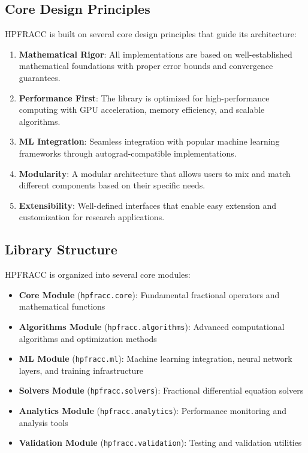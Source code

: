 \documentclass[12pt]{article}
\begin{document}
\subsection{Core Design Principles}

HPFRACC is built on several core design principles that guide its architecture:

\begin{enumerate}
\item \textbf{Mathematical Rigor}: All implementations are based on well-established mathematical foundations with proper error bounds and convergence guarantees.

\item \textbf{Performance First}: The library is optimized for high-performance computing with GPU acceleration, memory efficiency, and scalable algorithms.

\item \textbf{ML Integration}: Seamless integration with popular machine learning frameworks through autograd-compatible implementations.

\item \textbf{Modularity}: A modular architecture that allows users to mix and match different components based on their specific needs.

\item \textbf{Extensibility}: Well-defined interfaces that enable easy extension and customization for research applications.
\end{enumerate}

\subsection{Library Structure}

HPFRACC is organized into several core modules:

\begin{itemize}
\item \textbf{Core Module} (\texttt{hpfracc.core}): Fundamental fractional operators and mathematical functions
\item \textbf{Algorithms Module} (\texttt{hpfracc.algorithms}): Advanced computational algorithms and optimization methods
\item \textbf{ML Module} (\texttt{hpfracc.ml}): Machine learning integration, neural network layers, and training infrastructure
\item \textbf{Solvers Module} (\texttt{hpfracc.solvers}): Fractional differential equation solvers
\item \textbf{Analytics Module} (\texttt{hpfracc.analytics}): Performance monitoring and analysis tools
\item \textbf{Validation Module} (\texttt{hpfracc.validation}): Testing and validation utilities
\end{itemize}
\end{document}
